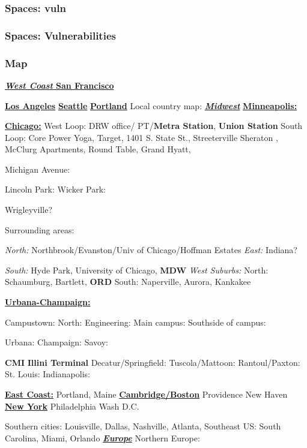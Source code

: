 \begin{frame}
\frametitle{Spaces: vuln}
\end{frame}

\begin{frame} 
\frametitle{Spaces: Vulnerabilities} 
\end{frame}



\begin{frame} 
\frametitle{Map}
\textit{\underline{\textbf{West Coast} }}
\underline{\textbf{San Francisco}} 

\underline{\textbf{Los Angeles}}
\underline{\textbf{Seattle}}
\underline{\textbf{Portland}} 
Local country map:
\textbf{\underline{\textit{Midwest}}}
\underline{\textbf{Minneapolis: }}

\underline{\textbf{Chicago:}}
West Loop: DRW office/ PT/\textbf{Metra Station},  \textbf{Union
  Station}
South Loop: Core Power Yoga, Target, 1401 S. State St.,
Streeterville Sheraton ,   McClurg Apartments, Round Table, Grand
Hyatt,

Michigan Avenue:

Lincoln Park:
Wicker Park:

Wrigleyville?

Surrounding areas:

\textit{North:} Northbrook/Evanston/Univ of Chicago/Hoffman Estates
\textit{East:} Indiana?

\textit{South:} Hyde Park, University of Chicago, \textbf{MDW}
\textit{West Suburbs:}
  North: Schaumburg, Bartlett, \textbf{ORD}
  South: Naperville, Aurora, Kankakee

\underline{\textbf{Urbana-Champaign:}} 

Campustown:
  North: Engineering:
  Main campus:
  Southside of campus:

Urbana:
Champaign:
Savoy:

\textbf{CMI}
\textbf{Illini Terminal}
Decatur/Springfield:
Tuscola/Mattoon:
Rantoul/Paxton:
St. Louis:
Indianapolis:


\underline{\textbf{East Coast:}} 
Portland, Maine
\underline{\textbf{Cambridge/Boston}}
Providence
New Haven
\underline{\textbf{New York}}
Philadelphia
Wash D.C.

Southern cities:
Louisville,
Dallas, Nashville,
Atlanta,
Southeast US:
South Carolina,
Miami,
Orlando
\textit{\underline{\textbf{Europe}}} 
Northern Europe: 


\end{frame}
